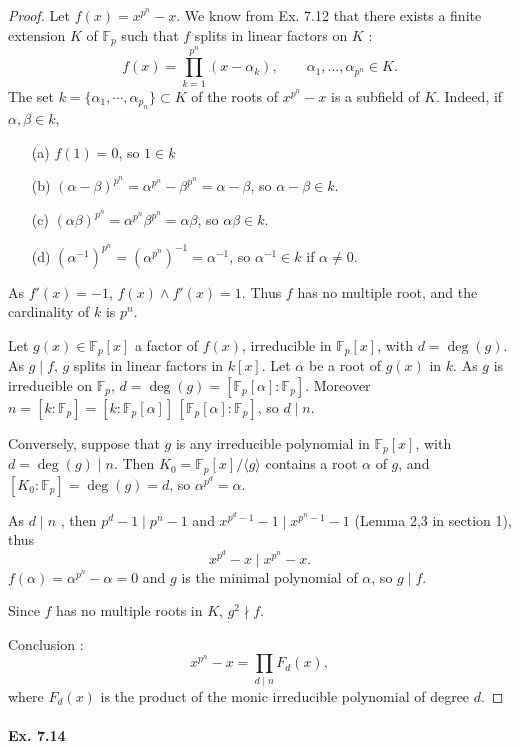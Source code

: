 \documentclass[11pt,a4paper]{article}
\newcommand{\F}{\mathbb{F}}
\begin{document}
\begin{proof}
Let $f(x) =  x^{p^n} -x$. We know from Ex. 7.12 that there exists a finite extension $K$ of $\F_p$ such that $f$ splits in linear factors on $K$ :
$$f(x) = \prod_{k=1}^{p^n} (x-\alpha_k), \qquad \alpha_1,\ldots, \alpha_{p^n} \in K.$$
The set $k =\{\alpha_1,\cdots,\alpha_{p_n}\} \subset K$ of the roots of $x^{p^n} -x$ is a subfield of $K$. Indeed, if $\alpha, \beta \in k$,
\begin{enumerate}
\item[(a)] $f(1) = 0$, so $1 \in k$
\item[(b)]$(\alpha- \beta)^{p^n} = \alpha^{p^n} - \beta^{p^n} = \alpha - \beta$, so $\alpha - \beta \in k$.
\item[(c)] $(\alpha\beta)^{p^n} = \alpha^{p^n} \beta^{p^n} = \alpha  \beta$, so $\alpha \beta \in k$.
\item[(d)] $(\alpha^{-1})^{p^n} = (\alpha^{p^n})^{-1} = \alpha^{-1}$, so $\alpha^{-1} \in k$ if $\alpha \ne 0$.
\end{enumerate}
As $f'(x) = -1$, $f(x) \wedge f'(x) = 1$. Thus $f$ has no multiple root, and the cardinality of $k$ is $p^n$.

Let $g(x) \in \F_p[x]$ a factor of $f(x)$, irreducible in $\F_p[x]$, with $d =\deg(g)$. As $g \mid f$, $g$ splits in linear factors in $k[x]$. Let $\alpha$ be a root of $g(x)$ in $k$. As $g$ is irreducible on $\F_p$, 
$d = \deg(g) = [\F_p[\alpha] : \F_p]$. Moreover $ n = [k : \F_p] = [k : \F_p[\alpha]]\,[\F_p[\alpha] : \F_p]$, so $d \mid n$.

Conversely, suppose that $g$ is any irreducible polynomial in $\F_p[x]$, with $d = \deg(g) \mid n$. Then $K_0 = \F_p[x]/ \langle g\rangle$  contains a root $\alpha$ of $g$, and $[K_0:\F_p] = \deg(g) = d$, so $\alpha^{p^d} = \alpha$.

As $d\mid n$ , then $p^d-1 \mid p^n-1$ and $x^{p^d -1}-1 \mid x^{p^n-1}-1$ (Lemma 2,3 in section 1), thus 
$$x^{p^d} - x \mid x^{p^n}-x.$$
$f(\alpha) = \alpha^{p^n} - \alpha = 0$ and $g$ is the minimal polynomial of $\alpha$, so $g \mid f$.

Since $f$ has no multiple roots in $K$, $g^2 \nmid f$.

Conclusion : 
$$ x^{p^n}-x = \prod_{d\mid n} F_d(x),$$
where $F_d(x)$ is the product of the monic irreducible polynomial of degree $d$.
\end{proof}

\paragraph{Ex. 7.14}
\end{document}
